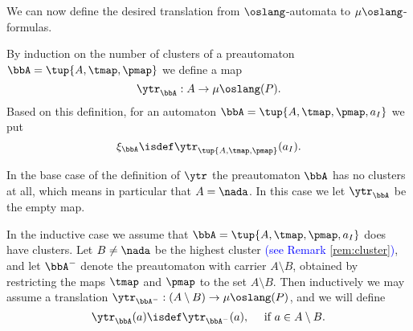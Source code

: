 \noindent
We can now define the desired translation from $\oslang$-automata to 
$\mu\oslang$-formulas.


\begin{definition}
\label{d:tr}
By induction on the number of clusters of a preautomaton $\bbA = \tup{A,\tmap,
\pmap}$ we define a map 
\[
\ytr_{\bbA}: A \to \mu\oslang(P).
\]
Based on this definition, for an automaton $\bbA = \tup{A,\tmap,\pmap, a_{I}}$ 
we put
\[
\xi_{\bbA} \isdef \ytr_{\tup{A,\tmap,\pmap}}(a_{I}).
\]

In the base case of the definition of $\ytr$ the preautomaton $\bbA$ has no 
clusters at all, which means in particular that $A = \nada$.
In this case we let $\ytr_{\bbA}$ be the empty map.

In the inductive case we assume that $\bbA = \tup{A,\tmap,\pmap, a_{I}}$ does 
have clusters. 
Let $B \neq \nada$ be the highest cluster \textcolor{blue}{(see Remark \ref{rem:cluster})}, and let $\bbA^{-}$ denote the 
preautomaton with carrier $A \setminus B$, obtained by restricting the maps 
$\tmap$ and $\pmap$ to the set $A \setminus B$.
Then inductively we may assume a translation $\ytr_{\bbA^{-}}: (A \setminus B)
\to \mu\oslang(P)$, and we will define
\[
\ytr_{\bbA}(a) \isdef \ytr_{\bbA^{-}}(a), \quad\text{ if } a \in A \setminus B.
\]


\end{definition}
